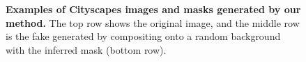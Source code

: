 \documentclass[runningheads]{llncs}
\begin{document}
\begin{figure}[tb]
\begin{tabular}
      
\end{tabular}
\caption{\textbf{Examples of Cityscapes images and masks generated by our method.} The top row shows the original image, and the middle row is the fake generated by compositing onto a random background with the inferred mask (bottom row). 
}
\label{figure:cityscapes_fake_4_categories}

\end{figure}
\end{document}
